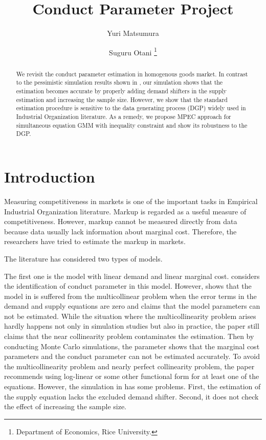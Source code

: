 \documentclass[11pt, a4paper]{article}
\title{Conduct Parameter Project}
\author{Yuri Matsumura \and Suguru Otani \footnote{Department of Economics, Rice University.}}
\begin{document}
\maketitle

\begin{abstract}
    We revisit the conduct parameter estimation in homogenous goods market. In contrast to the pessimistic simulation results shown in \cite{perloff2012collinearity}, our simulation shows that the estimation becomes accurate by properly adding demand shifters in the supply estimation and increasing the sample size. However, we show that the standard estimation procedure is sensitive to the data generating process (DGP) widely used in Industrial Organization literature. As a remedy, we propose MPEC approach \citep{su2012constrained,dube2012improving} for simultaneous equation GMM with inequality constraint and show its robustness to the DGP.
\end{abstract}

\section{Introduction}
Measuring competitiveness in markets is one of the important tasks in Empirical Industrial Organization literature.
Markup is regarded as a useful measure of competitiveness. 
However, markup cannot be measured directly from data because data usually lack information about marginal cost.
Therefore, the researchers have tried to estimate the markup in markets.



The literature has considered two types of models.

The first one is the model with linear demand and linear marginal cost.
\citet{bresnahan1982oligopoly} considers the identification of conduct parameter in this model.
However, \citet{perloff2012collinearity} shows that the model in \citet{bresnahan1982oligopoly} is suffered from the multicollinear problem when the error terms in the demand and supply equations are zero and claims that the model parameters can not be estimated.
While the situation where the multicollinearity problem arises hardly happens not only in simulation studies but also in practice, the paper still claims that the near collinearity problem contaminates the estimation.
Then by conducting Monte Carlo simulations, the parameter shows that the marginal cost parameters and the conduct parameter can not be estimated accurately.
To avoid the multicollinearity problem and nearly perfect collinearity problem, the paper recommends using log-linear or some other functional form for at least one of the equations.
However, the simulation in \cite{perloff2012collinearity} has some problems.
First, the estimation of the supply equation lacks the excluded demand shifter.
Second, it does not check the effect of increasing the sample size.
\end{document}

